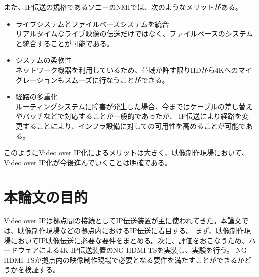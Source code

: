 \newpage
また、IP伝送の規格であるソニーのNMI\cite{sony-nmi}では、次のようなメリットがある。
\begin{itemize}
  \item ライブシステムとファイルベースシステムを統合\mbox{}\\
    リアルタイムなライブ映像の伝送だけではなく、ファイルベースのシステムと統合することが可能である。
  \item システムの柔軟性\mbox{}\\
    ネットワーク機器を利用しているため、帯域が許す限りHDから4Kへのマイグレーションもスムーズに行なうことができる。
  \item 経路の多重化\mbox{}\\
    ルーティングシステムに障害が発生した場合、今まではケーブルの差し替えやパッチなどで対応することが一般的であったが、
    IP伝送により経路を変更することにより、インフラ設備に対しての可用性を高めることが可能である。
\end{itemize}

このようにVideo over IP化によるメリットは大きく、映像制作現場において、Video over IP化が今後進んでいくことは明確である。

\section{本論文の目的}
Video over IPは拠点間の接続としてIP伝送装置が主に使われてきた。本論文では、映像制作現場などの拠点内におけるIP伝送に着目する。
まず、映像制作現場においてIP映像伝送に必要な要件をまとめる。次に、評価をおこなうため、ハードウェアによる4K IP伝送装置のNG-HDMI-TSを実装し、実験を行う。
NG-HDMI-TSが拠点内の映像制作現場で必要となる要件を満たすことができるかどうかを検証する。

